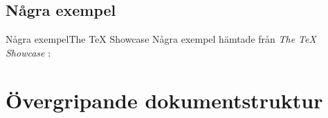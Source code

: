 \documentclass{beamer} %
\begin{document}
\subsection{Några exempel}
\begin{frame}{Några exempel}{The \TeX{} Showcase}
	Några exempel hämtade från \emph{The \TeX{} Showcase} \citep{TUG2012tsc}:
	\begin{figure}
		\hfill
		\hfill
		\hfill
	\end{figure}
\end{frame}


\section[Dokumentstruktur]{Övergripande dokumentstruktur}
\end{document}
